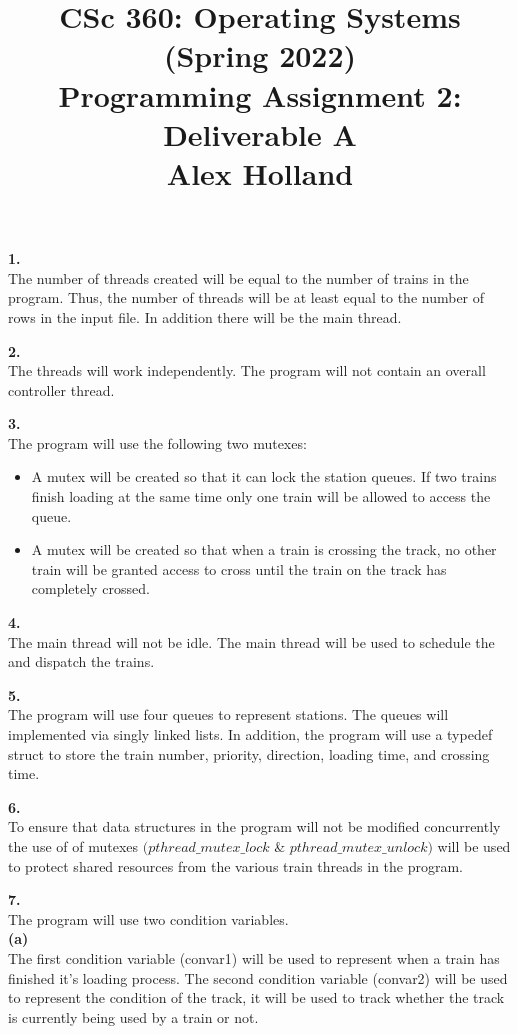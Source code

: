 \documentclass{article}
\title{%
   CSc 360: Operating Systems (Spring 2022) \\
   \large Programming Assignment 2: Deliverable A \\
    Alex Holland}
\date{}
\begin{document}
\maketitle

{\bf 1.}\\
The number of threads created will be equal to the number of trains in the program. Thus, the number of threads will be at least equal to the number of rows in the input file. In addition there will be the main thread.

\bigskip
{\bf 2.}\\
The threads will work independently. The program will not contain an overall controller thread.

\bigskip
{\bf 3.}\\
The program will use the following two mutexes:
\begin{itemize}
    \item A mutex will be created so that it can lock the station queues. If two trains finish loading at the same time only one train will be allowed to access the queue.
    \item A mutex will be created so that when a train is crossing the track, no other train will be granted access to cross until the train on the track has completely crossed.
\end{itemize}

\bigskip
{\bf 4.}\\
The main thread will not be idle. The main thread will be used to schedule the and dispatch the trains.

\bigskip
{\bf 5.}\\
The program will use four queues to represent stations. The queues will implemented via singly linked lists. In addition, the program will use a typedef struct to store the train number, priority, direction, loading time, and crossing time.

\bigskip
{\bf 6.}\\
To ensure that data structures in the program will not be modified concurrently the use of of mutexes $(pthread\_mutex\_lock$ \& $pthread\_mutex\_unlock)$ will be used to protect shared resources from the various train threads in the program.

\bigskip
{\bf 7.}\\
The program will use two condition variables.\\

\smallskip
{\bf (a)}\\
The first condition variable (convar1) will be used to represent when a train has finished it's loading process. The second condition variable (convar2) will be used to represent the condition of the track, it will be used to track whether the track is currently being used by a train or not.
\end{document}
